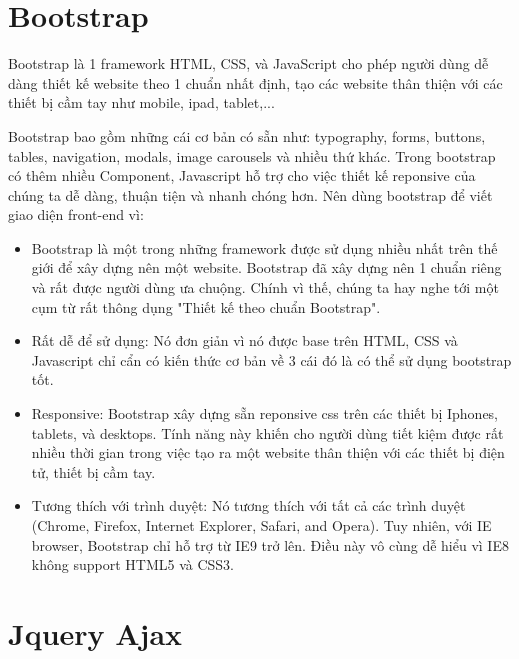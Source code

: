 \section{Bootstrap}
Bootstrap là 1 framework HTML, CSS, và JavaScript cho phép người dùng dễ dàng thiết kế website theo 1 chuẩn nhất định, tạo các website thân thiện với các thiết bị cầm tay như mobile, ipad, tablet,...
\par
Bootstrap bao gồm những cái cơ bản có sẵn như: typography, forms, buttons, tables, navigation, modals, image carousels và nhiều thứ khác. Trong bootstrap có thêm nhiều Component, Javascript hỗ trợ cho việc thiết kế reponsive của chúng ta dễ dàng, thuận tiện và nhanh chóng hơn. Nên dùng bootstrap để viết giao diện front-end vì:
\begin{itemize}
\item Bootstrap là một trong những framework được sử dụng nhiều nhất trên thế giới để xây dựng nên một website. Bootstrap đã xây dựng nên 1 chuẩn riêng và rất được người dùng ưa chuộng. Chính vì thế, chúng ta hay nghe tới một cụm từ rất thông dụng "Thiết kế theo chuẩn Bootstrap".
\item Rất dễ để sử dụng: Nó đơn giản vì nó được base trên HTML, CSS và Javascript chỉ cẩn có kiến thức cơ bản về 3 cái đó là có thể sử dụng bootstrap tốt.
\item Responsive: Bootstrap xây dựng sẵn reponsive css trên các thiết bị Iphones, tablets, và desktops. Tính năng này khiến cho người dùng tiết kiệm được rất nhiều thời gian trong việc tạo ra một website thân thiện với các thiết bị điện tử, thiết bị cầm tay.
\item Tương thích với trình duyệt: Nó tương thích với tất cả các trình duyệt (Chrome, Firefox, Internet Explorer, Safari, and Opera). Tuy nhiên, với IE browser, Bootstrap chỉ hỗ trợ từ IE9 trở lên. Điều này vô cùng dễ hiểu vì IE8 không support HTML5 và CSS3.
\end{itemize}

\section{Jquery Ajax}
